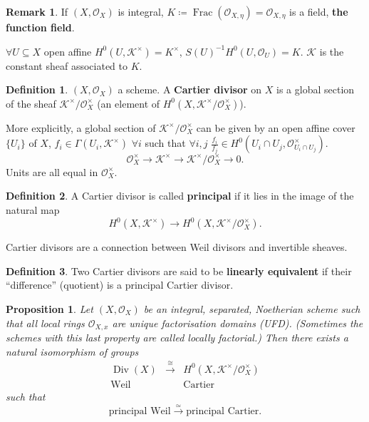 \documentclass[12pt]{article}
\DeclareMathOperator{\Frac}{Frac}
\DeclareMathOperator{\Div}{Div}
\newtheorem*{proposition}{Proposition}
\theoremstyle{definition}
\newtheorem*{definition}{Definition}
\newtheorem*{remark}{Remark}
\begin{document}
\begin{remark}
If $(X,\mathcal O_X)$ is integral, $K\coloneqq\Frac(\mathcal O_{X,\eta})=\mathcal O_{X,\eta}$ is a field, \textbf{the function field}.

$\forall U\subseteq X$ open affine $H^0(U,\mathcal K^\times)=K^\times$, $S(U)^{-1}H^0(U,\mathcal O_U)=K$. $\mathcal K$ is the constant sheaf associated to $K$.
\end{remark}

\begin{definition}
$(X,\mathcal O_X)$ a scheme. A \textbf{Cartier divisor} on $X$ is a global section of the sheaf $\mathcal K^\times/\mathcal O_X^\times$ (an element of $H^0(X,\mathcal K^\times/\mathcal O_X^\times)$).
\end{definition}

More explicitly, a global section of $\mathcal K^\times/\mathcal O_X^\times$ can be given by an open affine cover $\{U_i\}$ of $X$, $f_i\in\Gamma(U_i,\mathcal K^\times)$ $\forall i$ such that $\forall i,j$ $\frac{f_i}{f_j}\in H^0(U_i\cap U_j,\mathcal O_{U_i\cap U_j}^\times)$.
\[\mathcal O_X^\times\longrightarrow\mathcal K^\times\longrightarrow\mathcal K^\times/\mathcal O_X^\times\longrightarrow0.\]
Units are all equal in $\mathcal O_X^\times$.

\begin{definition}
A Cartier divisor is called \textbf{principal} if it lies in the image of the natural map
\[H^0(X,\mathcal K^\times)\longrightarrow H^0(X,\mathcal K^\times/\mathcal O_X^\times).\]
\end{definition}
Cartier divisors are a connection between Weil divisors and invertible sheaves.

\begin{definition}
Two Cartier divisors are said to be \textbf{linearly equivalent} if their ``difference'' (quotient) is a principal Cartier divisor.
\end{definition}

\begin{proposition}
Let $(X,\mathcal O_X)$ be an integral, separated, Noetherian scheme such that all local rings $\mathcal O_{X,x}$ are unique factorisation domains (UFD). (Sometimes the schemes with this last property are called locally factorial.) Then there exists a natural isomorphism of groups
\[\begin{array}{ccc}\Div(X)&\overset\cong\longrightarrow&H^0(X,\mathcal K^\times/\mathcal O_X^\times)\\\text{Weil}&&\text{Cartier}\end{array}\]
such that
\[\text{principal Weil}\overset\simeq\longrightarrow\text{principal Cartier}.\]
\end{proposition}
\end{document}
